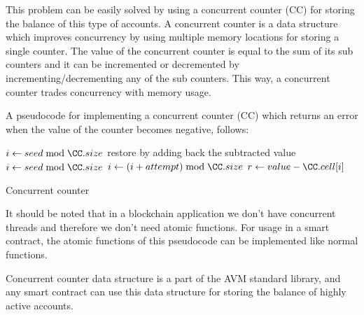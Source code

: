 \documentclass[11pt, A4]{report}
\begin{document}
    This problem can be easily solved by using a concurrent counter (CC) for storing the balance of this type of
    accounts. A concurrent counter is a data structure which improves concurrency by using multiple memory locations for
    storing a single counter. The value of the concurrent counter is equal to the sum of its sub counters and it can
    be incremented or decremented by incrementing/decrementing any of the sub counters. This way, a concurrent
    counter trades concurrency with memory usage.

    A pseudocode for implementing a concurrent counter (CC) which returns an error when the value of the counter
    becomes negative, follows:

    \begin{algorithm}
        \DontPrintSemicolon
        \BlankLine
        {
            $i \gets seed \bmod \CC.size$\;
           \;
        }
        \BlankLine
        {
            {
                restore \CC by adding back the subtracted value\;
                \;
            }
            $i \gets seed \bmod \CC.size$\;
            $i \gets (i + attempt) \bmod \CC.size$\;
            {
                \;
            }{
                $r \gets value - \CC.cell[i]$\;
                \;
                \;
            }
        }
        \caption{Concurrent counter}\label{alg:CC}
    \end{algorithm}

    It should be noted that in a blockchain application we don't have concurrent threads and therefore we don't need
    atomic functions. For usage in a smart contract, the atomic functions of this pseudocode can be implemented like
    normal functions.

    Concurrent counter data structure is a part of the AVM standard library, and any smart contract can use this data
    structure for storing the balance of highly active accounts.
\end{document}
